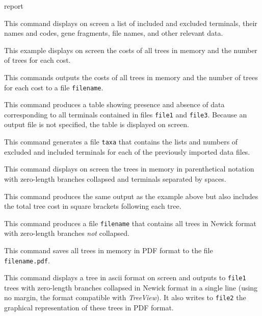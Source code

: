 \begin{command}{report}{}
\begin{poyexamples}
            {This command displays on screen a list of included and excluded terminals, their
            names and codes, gene fragments, file names, and other relevant data.}
            
            {This example displays on screen the costs of all trees in memory and the
            number of trees for each cost.}

            {This commands outputs the costs of all trees in memory and the
            number of trees for each cost to a file \texttt{filename}.}

		{This command produces a table showing presence
		and absence of data corresponding to all terminals contained
		in files \texttt{file1} and \texttt{file3}. Because an output
		file is not specified, the table is displayed on screen.}
		
		{This command generates a file \texttt{taxa} that contains the
		lists and numbers of excluded and included terminals for each of the previously
		imported data files.}
		
            {This command displays on screen the trees in memory in parenthetical
            notation with zero-length branches collapsed and terminals
            separated by spaces.}

            {This command produces the same output as the example above
            but also includes the total tree cost in square brackets
            following each tree.}

            {This command produces a file \texttt{filename} that contains
            all trees in Newick format with zero-length branches \emph{not}
            collapsed.}
		
            {This command saves all trees in memory in
            PDF format to the file \texttt{filename.pdf}.}

		{This command displays a tree in ascii format on screen and outputs
		to \texttt{file1} trees with zero-length branches collapsed in Newick format
		in a single line (using no margin, the format compatible with \emph{TreeView}). It
		also writes to \texttt{file2} the graphical representation of these trees in
		PDF format.}


\end{poyexamples}
\end{command}
